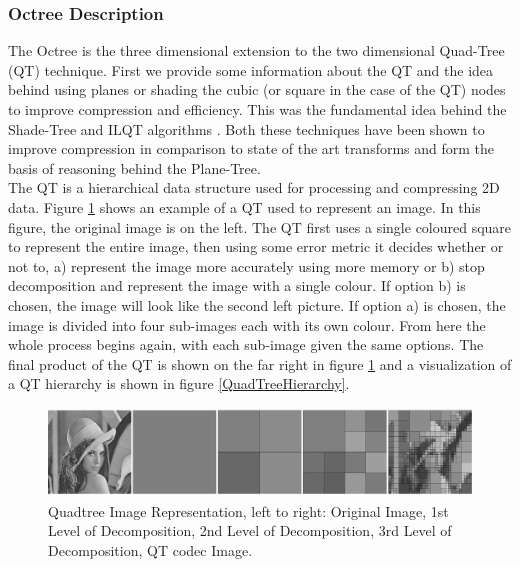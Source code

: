 \subsubsection{Octree Description}
\label{OTDesc}

The Octree is the three dimensional extension to the two dimensional Quad-Tree (QT) technique. First we provide some information about the QT and the idea behind using planes or shading the cubic (or square in the case of the QT) nodes to improve compression and efficiency. This was the fundamental idea behind the Shade-Tree and ILQT algorithms \cite{Gonzalez07ShadeTree, Lincoln13Interpolating}. Both these techniques have been shown to improve compression in comparison to state of the art transforms and form the basis of reasoning behind the Plane-Tree. \\

The QT is a hierarchical data structure used for processing and compressing 2D data. Figure \ref{QuadtreeExample} shows an example of a QT used to represent an image. In this figure, the original image is on the left. The QT first uses a single coloured square to represent the entire image, then using some error metric it decides whether or not to, a) represent the image more accurately using more memory or b) stop decomposition and represent the image with a single colour. If option b) is chosen, the image will look like the second left picture. If option a) is chosen, the image is divided into four sub-images each with its own colour. From here the whole process begins again, with each sub-image given the same options. The final product of the QT is shown on the far right in figure \ref{QuadtreeExample} and a visualization of a QT hierarchy is shown in figure \ref{QuadTreeHierarchy}. \\


\begin{figure}[!htb]
\centering
\includegraphics[width=12cm]{images/ch2/quadtreeexample}
\caption{Quadtree Image Representation, left to right: Original Image, 1st Level of Decomposition, 2nd Level of Decomposition, 3rd Level of Decomposition, QT codec Image.}
\label{QuadtreeExample}
\end{figure}


